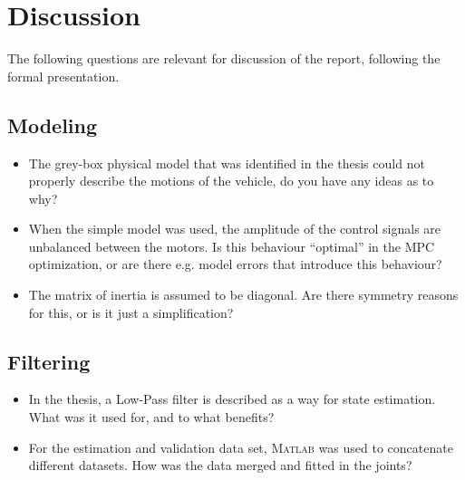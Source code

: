\section{Discussion}
\label{sec:discussion}
The following questions are relevant for discussion of the report, following
the formal presentation.

\subsection{Modeling}
\begin{itemize}
	\item The grey-box physical model that was identified in the thesis
			could not properly describe the motions of the vehicle, do you have any ideas as to why?
			
	\item When the simple model was used, the amplitude of the control signals
			are unbalanced between the motors. 
			Is this behaviour ``optimal'' in the MPC optimization, or are
			there e.g. model errors that introduce this behaviour?
			
	\item The matrix of inertia is assumed to be diagonal. Are there symmetry reasons for this,
			or is it just a simplification?
\end{itemize}

\subsection{Filtering}
\begin{itemize}
	\item In the thesis, a Low-Pass filter is described as a way for state estimation. What was it used for,
			and to what benefits?
			
	\item For the estimation and validation data set, \textsc{Matlab} 
			was used to concatenate different datasets. How was the data merged and fitted in the joints?
\end{itemize}

